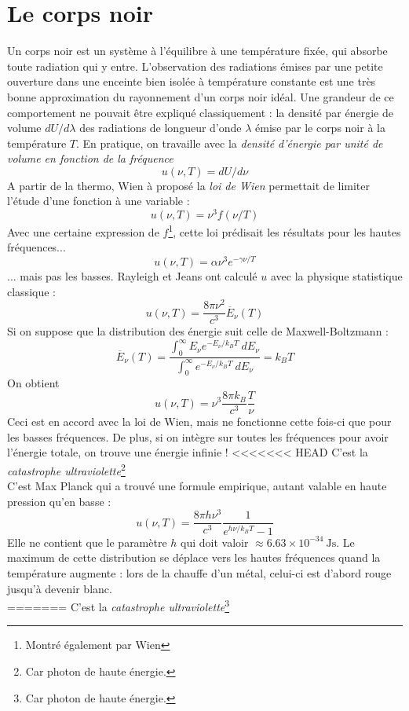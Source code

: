 \documentclass	[11pt, a4paper, openany]{book}
\begin{document}
\section{Le corps noir}
Un corps noir est un système à l'équilibre à une température fixée, qui absorbe toute radiation qui y 
entre. L'observation des radiations émises par une petite ouverture dans une enceinte bien isolée à 
température constante est une très bonne approximation du rayonnement d'un corps noir idéal. Une 
grandeur de ce comportement ne pouvait être expliqué classiquement : la densité par énergie de volume 
$dU/d\lambda$ des radiations de longueur d'onde $\lambda$ émise par le corps noir à la température $T$.
En pratique, on travaille avec la \textit{densité d'énergie par unité de volume en fonction de la fréquence} 
\begin{equation}
u(\nu,T) = dU/d\nu
\end{equation}
A partir de la thermo, Wien à proposé la \textit{loi de Wien} permettait de limiter l'étude d'une fonction
à une variable :
\begin{equation}
u(\nu,T) = \nu^3f(\nu/T)
\end{equation}
Avec une certaine expression de $f$\footnote{Montré également par Wien}, cette loi prédisait les résultats 
pour les hautes fréquences...
\begin{equation}
u(\nu,T) = \alpha \nu^3 e^{-\gamma\nu/T}
\end{equation}
... mais pas les basses. Rayleigh et Jeans ont calculé $u$ avec la physique statistique classique :
\begin{equation}
u(\nu,T) = \dfrac{8\pi\nu^2}{c^3}\overline{E}_\nu(T)
\label{eq:IdeePlanck}
\end{equation}
Si on suppose que la distribution des énergie suit celle de Maxwell-Boltzmann :
\begin{equation}
\overline{E}_\nu(T) = \dfrac{\int_0^\infty E_\nu e^{-E_\nu/k_BT}\ dE_\nu}{\int_0^\infty
e^{-E_\nu/k_BT}\ dE_\nu} = k_BT
\label{eq:CalculEv}
\end{equation}
On obtient
\begin{equation}
u(\nu,T) = \nu^3\dfrac{8\pi k_B}{c^3}\dfrac{T}{\nu}
\end{equation}
Ceci est en accord avec la loi de Wien, mais ne fonctionne cette fois-ci que pour les basses fréquences. De 
plus, si on intègre sur toutes les fréquences pour avoir l'énergie totale, on trouve une énergie infinie ! 
<<<<<<< HEAD
C'est la \textit{catastrophe ultraviolette}\footnote{Car photon de haute énergie.}\\
C'est Max Planck qui a trouvé une formule empirique, autant valable en haute pression qu'en basse :
\begin{equation}
u(\nu,T) = \dfrac{8\pi h\nu^3}{c^3}\dfrac{1}{e^{h\nu/k_BT}-1}
\label{eq:FormulePlanck}
\end{equation}
Elle ne contient que le paramètre $h$ qui doit valoir $\approx 6.63\times 10^{-34}\ \text{Js}$. Le maximum 
de cette distribution se déplace vers les hautes fréquences quand la température augmente : lors de la 
chauffe d'un métal, celui-ci est d'abord rouge jusqu'à devenir blanc.\\
=======
C'est la \textit{catastrophe ultraviolette}\footnote{Car photon de haute énergie.}
\end{document}
